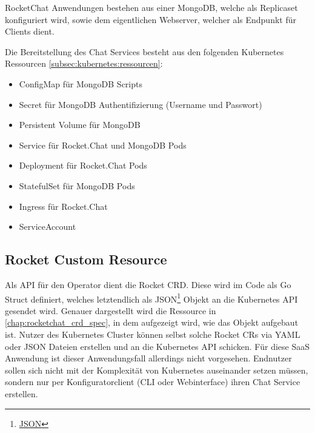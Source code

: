 RocketChat Anwendungen bestehen aus einer MongoDB, welche als Replicaset konfiguriert wird,
sowie dem eigentlichen Webserver, welcher als Endpunkt für Clients dient.

Die Bereitstellung des Chat Services besteht aus den folgenden Kubernetes Ressourcen \ref{subsec:kubernetes:ressourcen}:
\begin{itemize}
  \item ConfigMap für MongoDB Scripts
  \item Secret für MongoDB Authentifizierung (Username und Passwort)
  \item Persistent Volume für MongoDB
  \item Service für Rocket.Chat und MongoDB Pods
  \item Deployment für Rocket.Chat Pods
  \item StatefulSet für MongoDB Pods
  \item Ingress für Rocket.Chat
  \item ServiceAccount
\end{itemize} 

\subsection{Rocket Custom Resource}
Als API für den Operator dient die Rocket \ac{CRD}. Diese wird im Code als Go Struct definiert, welches letztendlich
als JSON\footnote{\href{https://www.json.org/json-de.html}{JSON}} Objekt an die Kubernetes API gesendet wird.
Genauer dargestellt wird die Ressource in \ref{chap:rocketchat_crd_spec}, in dem aufgezeigt wird, wie das Objekt aufgebaut ist.
Nutzer des Kubernetes Cluster können selbst solche Rocket \acp{CR} via YAML oder JSON Dateien erstellen und
an die Kubernetes API schicken. Für diese \ac{SaaS} Anwendung ist dieser Anwendungsfall allerdings nicht vorgesehen.
Endnutzer sollen sich nicht mit der Komplexität von Kubernetes auseinander setzen müssen, 
sondern nur per Konfiguratorclient (\ac{CLI} oder Webinterface) ihren Chat Service erstellen.


